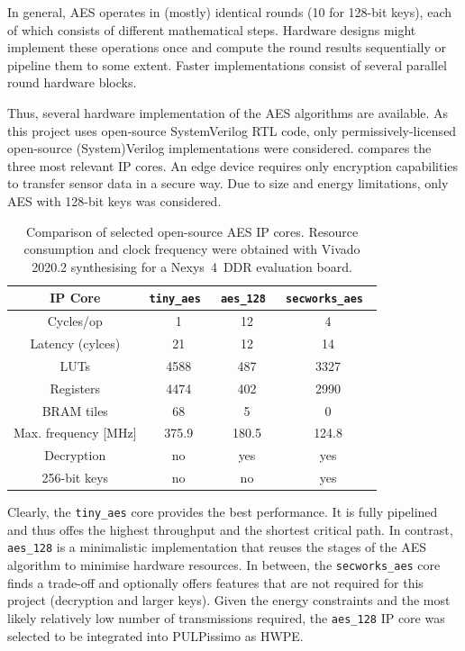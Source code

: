 \documentclass[a4paper, 12pt]{article}
\begin{document}
In general, AES operates in (mostly) identical rounds (10 for 128-bit keys), each of which consists of different mathematical steps. Hardware designs might implement these operations once and compute the round results sequentially or pipeline them to some extent. Faster implementations consist of several parallel round hardware blocks.

Thus, several hardware implementation of the AES algorithms are available. As this project uses open-source SystemVerilog RTL code, only permissively-licensed open-source (System)Verilog implementations were considered.  compares the three most relevant IP cores. An edge device requires only encryption capabilities to transfer sensor data in a secure way. Due to size and energy limitations, only AES with 128-bit keys was considered.

\begin{table}[h]
    \centering
    \begin{tabular}{c|c c c}
        \toprule
        IP Core &  \verb|tiny_aes|~\cite{tiny-aes} & \verb|aes_128|~\cite{aes-128} & \verb|secworks_aes|~\cite{secworks-aes}  \\
        \midrule
        Cycles/op &  1 & 12 & 4\\
        Latency (cylces) & 21 & 12 & 14\\
        LUTs & 4588 & 487 & 3327 \\
        Registers & 4474 & 402 & 2990 \\
        BRAM tiles & 68 & 5 & 0 \\
        Max. frequency [MHz] & 375.9 & 180.5 & 124.8 \\
        Decryption & no & yes  & yes \\
        256-bit keys & no & no & yes\\
        \bottomrule
    \end{tabular}
	\caption{Comparison of selected open-source AES IP cores. Resource consumption and clock frequency were obtained with Vivado 2020.2 synthesising for a Nexys~4~DDR evaluation board.}
	\label{tab:aes_cores}
\end{table}

Clearly, the \verb|tiny_aes| core provides the best performance. It is fully pipelined and thus offes the highest throughput and the shortest critical path. In contrast, \verb|aes_128| is a minimalistic implementation that reuses the stages of the AES algorithm to minimise hardware resources. In between, the \verb|secworks_aes| core finds a trade-off and optionally offers features that are not required for this project (decryption and larger keys). Given the energy constraints and the most likely relatively low number of transmissions required, the \verb|aes_128| IP core was selected to be integrated into PULPissimo as HWPE.
\end{document}
